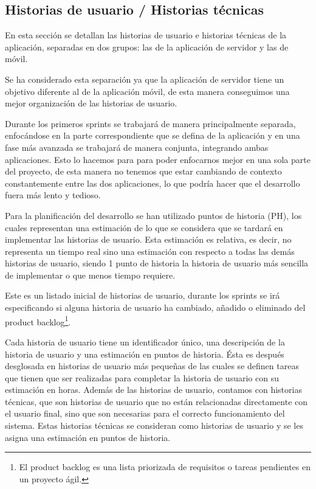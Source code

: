 \subsection{Historias de usuario / Historias técnicas}
En esta sección se detallan las historias de usuario e historias técnicas de la aplicación, separadas en dos grupos: las de la aplicación de servidor y las de móvil.

Se ha considerado esta separación ya que la aplicación de servidor tiene un objetivo diferente al de la aplicación móvil, de esta manera conseguimos una mejor organización de las historias de usuario.

Durante los primeros sprints se trabajará de manera principalmente separada, enfocándose en la parte correspondiente que se defina de la aplicación y en una fase más avanzada se trabajará de manera conjunta, integrando ambas aplicaciones. Esto lo hacemos para para poder enfocarnos mejor en una sola parte del proyecto, de esta manera no tenemos que estar cambiando de contexto constantemente entre las dos aplicaciones, lo que podría hacer que el desarrollo fuera más lento y tedioso.

Para la planificación del desarrollo se han utilizado puntos de historia (PH), los cuales representan una estimación de lo que se considera que se tardará en implementar las historias de usuario. Esta estimación es relativa, es decir, no representa un tiempo real sino una estimación con respecto a todas las demás historias de usuario, siendo 1 punto de historia la historia de usuario más sencilla de implementar o que menos tiempo requiere.

Este es un listado inicial de historias de usuario, durante los sprints se irá especificando si alguna historia de usuario ha cambiado, añadido o eliminado del product backlog\footnote{El product backlog es una lista priorizada de requisitos o tareas pendientes en un proyecto ágil.}.

Cada historia de usuario tiene un identificador único, una descripción de la historia de usuario y una estimación en puntos de historia. Ésta es después desglosada en historias de usuario más pequeñas de las cuales se definen tareas que tienen que ser realizadas para completar la historia de usuario con su estimación en horas.
Además de las historias de usuario, contamos con historias técnicas, que son historias de usuario que no están relacionadas directamente con el usuario final, sino que son necesarias para el correcto funcionamiento del sistema. Estas historias técnicas se consideran como historias de usuario y se les asigna una estimación en puntos de historia.

